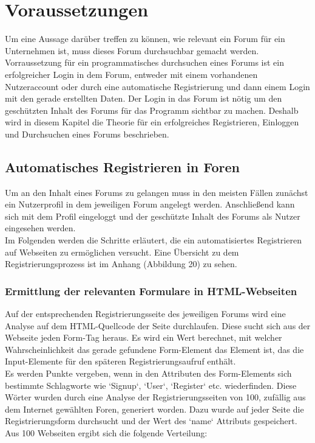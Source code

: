 \section{Voraussetzungen}
Um eine Aussage darüber treffen zu können, wie relevant ein Forum für ein Unternehmen ist, muss dieses Forum durchsuchbar gemacht werden.
Vorraussetzung für ein programmatisches durchsuchen eines Forums ist ein erfolgreicher Login in dem Forum, entweder mit einem vorhandenen Nutzeraccount oder durch eine automatische Registrierung und dann einem Login mit den gerade erstellten Daten.
Der Login in das Forum ist nötig um den geschützten Inhalt des Forums für das Programm sichtbar zu machen. Deshalb wird in diesem Kapitel die Theorie für ein erfolgreiches Registrieren, Einloggen und Durchsuchen eines Forums beschrieben.

\subsection {Automatisches Registrieren in Foren}
Um an den Inhalt eines Forums zu gelangen muss in den meisten Fällen zunächst ein Nutzerprofil in dem jeweiligen Forum angelegt werden. Anschließend kann sich mit dem Profil eingeloggt und der geschützte Inhalt des Forums als Nutzer eingesehen werden. \\
Im Folgenden werden die Schritte erläutert, die ein automatisiertes Registrieren auf Webseiten zu ermöglichen versucht.
Eine Übersicht zu dem Registrierungsprozess ist im Anhang (Abbildung 20) zu sehen.

\subsubsection{Ermittlung der relevanten Formulare in HTML-Webseiten}
Auf der entsprechenden Registrierungsseite des jeweiligen Forums wird eine Analyse auf dem HTML-Quellcode der Seite durchlaufen.
Diese sucht sich aus der Webseite jeden Form-Tag heraus. Es wird ein Wert berechnet, mit welcher Wahrscheinlichkeit das gerade gefundene Form-Element das Element ist, das die Input-Elemente für den späteren Registrierungsaufruf enthält. \\
Es werden Punkte vergeben, wenn in den Attributen des Form-Elements sich bestimmte Schlagworte wie `Signup`, `User`, `Register` etc. wiederfinden.
Diese Wörter wurden durch eine Analyse der Registrierungsseiten von 100, zufällig aus dem Internet gewählten Foren, generiert worden. Dazu wurde auf jeder Seite die Registrierungsform durchsucht und der Wert des `name` Attributs gespeichert. Aus 100 Webseiten ergibt sich die folgende Verteilung:

